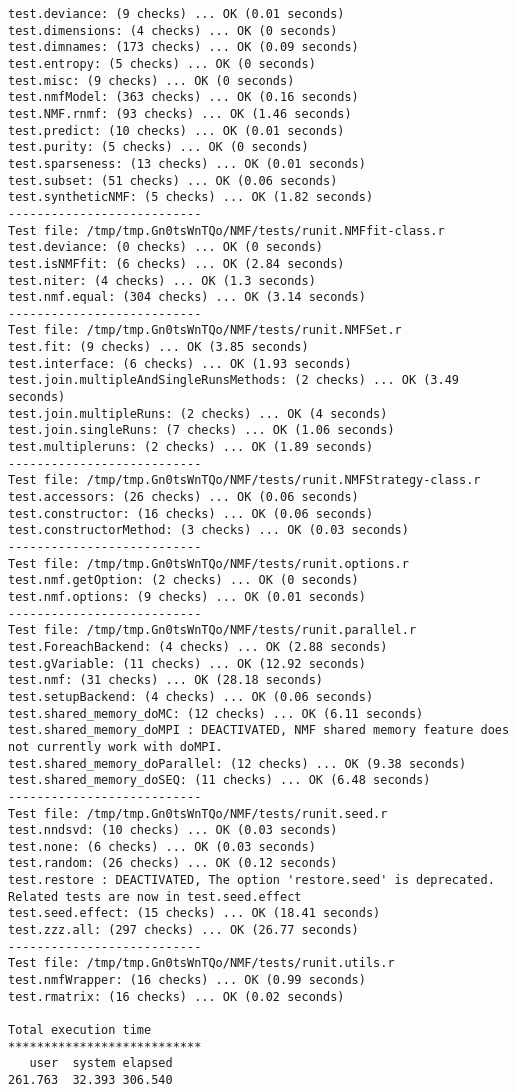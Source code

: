 \documentclass[10pt]{article}
\begin{document}
\begin{verbatim}
test.deviance: (9 checks) ... OK (0.01 seconds)
test.dimensions: (4 checks) ... OK (0 seconds)
test.dimnames: (173 checks) ... OK (0.09 seconds)
test.entropy: (5 checks) ... OK (0 seconds)
test.misc: (9 checks) ... OK (0 seconds)
test.nmfModel: (363 checks) ... OK (0.16 seconds)
test.NMF.rnmf: (93 checks) ... OK (1.46 seconds)
test.predict: (10 checks) ... OK (0.01 seconds)
test.purity: (5 checks) ... OK (0 seconds)
test.sparseness: (13 checks) ... OK (0.01 seconds)
test.subset: (51 checks) ... OK (0.06 seconds)
test.syntheticNMF: (5 checks) ... OK (1.82 seconds)
--------------------------- 
Test file: /tmp/tmp.Gn0tsWnTQo/NMF/tests/runit.NMFfit-class.r 
test.deviance: (0 checks) ... OK (0 seconds)
test.isNMFfit: (6 checks) ... OK (2.84 seconds)
test.niter: (4 checks) ... OK (1.3 seconds)
test.nmf.equal: (304 checks) ... OK (3.14 seconds)
--------------------------- 
Test file: /tmp/tmp.Gn0tsWnTQo/NMF/tests/runit.NMFSet.r 
test.fit: (9 checks) ... OK (3.85 seconds)
test.interface: (6 checks) ... OK (1.93 seconds)
test.join.multipleAndSingleRunsMethods: (2 checks) ... OK (3.49 seconds)
test.join.multipleRuns: (2 checks) ... OK (4 seconds)
test.join.singleRuns: (7 checks) ... OK (1.06 seconds)
test.multipleruns: (2 checks) ... OK (1.89 seconds)
--------------------------- 
Test file: /tmp/tmp.Gn0tsWnTQo/NMF/tests/runit.NMFStrategy-class.r 
test.accessors: (26 checks) ... OK (0.06 seconds)
test.constructor: (16 checks) ... OK (0.06 seconds)
test.constructorMethod: (3 checks) ... OK (0.03 seconds)
--------------------------- 
Test file: /tmp/tmp.Gn0tsWnTQo/NMF/tests/runit.options.r 
test.nmf.getOption: (2 checks) ... OK (0 seconds)
test.nmf.options: (9 checks) ... OK (0.01 seconds)
--------------------------- 
Test file: /tmp/tmp.Gn0tsWnTQo/NMF/tests/runit.parallel.r 
test.ForeachBackend: (4 checks) ... OK (2.88 seconds)
test.gVariable: (11 checks) ... OK (12.92 seconds)
test.nmf: (31 checks) ... OK (28.18 seconds)
test.setupBackend: (4 checks) ... OK (0.06 seconds)
test.shared_memory_doMC: (12 checks) ... OK (6.11 seconds)
test.shared_memory_doMPI : DEACTIVATED, NMF shared memory feature does not currently work with doMPI.
test.shared_memory_doParallel: (12 checks) ... OK (9.38 seconds)
test.shared_memory_doSEQ: (11 checks) ... OK (6.48 seconds)
--------------------------- 
Test file: /tmp/tmp.Gn0tsWnTQo/NMF/tests/runit.seed.r 
test.nndsvd: (10 checks) ... OK (0.03 seconds)
test.none: (6 checks) ... OK (0.03 seconds)
test.random: (26 checks) ... OK (0.12 seconds)
test.restore : DEACTIVATED, The option 'restore.seed' is deprecated. Related tests are now in test.seed.effect
test.seed.effect: (15 checks) ... OK (18.41 seconds)
test.zzz.all: (297 checks) ... OK (26.77 seconds)
--------------------------- 
Test file: /tmp/tmp.Gn0tsWnTQo/NMF/tests/runit.utils.r 
test.nmfWrapper: (16 checks) ... OK (0.99 seconds)
test.rmatrix: (16 checks) ... OK (0.02 seconds)

Total execution time
***************************
   user  system elapsed 
261.763  32.393 306.540 

\end{verbatim}
\end{document}
